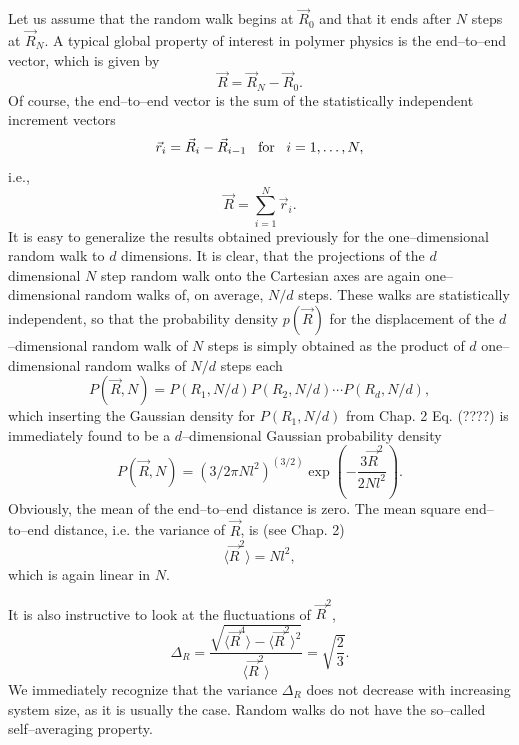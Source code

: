 Let us assume that the random walk begins at $\vec{R}_0$ and that 
it ends after $N$ steps at $\vec{R}_N$. A typical global property
of interest in polymer physics is the end--to--end vector,
which is given by
\begin{equation*}
\vec{R} = \vec{R}_N -\vec{R}_0.
\end{equation*}
Of course, the end--to--end vector is the sum of the statistically 
independent increment vectors
\begin{equation*}
\vec{r}_i = \vec{R}_i - \vec{R}_{i-1} \;\;\; {\rm for} \;\;\; 
       i=1, \ldots, N,
\end{equation*}
i.e.,
\begin{equation*}
\vec{R} = \sum_{i=1}^N \vec{r}_i.
\end{equation*}
It is easy to generalize the results obtained previously for the 
one--dimensional random walk to $d$ dimensions. It is clear, that 
the projections of the $d$ dimensional $N$ step random walk onto 
the Cartesian axes are again one--dimensional random walks of, on 
average, $N/d$ steps. These walks are statistically independent, 
so that the probability density $p(\vec{R})$ for the displacement
of the $d$--dimensional random walk of $N$ steps is simply 
obtained as the product of $d$ one--dimensional random walks of $N/d$
steps each
\begin{equation*}
P(\vec{R},N) = P(R_1,N/d) P(R_2,N/d) \cdots P(R_d,N/d),
\end{equation*}
which inserting the Gaussian density for $P(R_1,N/d)$ from Chap. 2 Eq. 
(????) is immediately found to be a $d$--dimensional Gaussian 
probability density
\begin{equation*}
P(\vec{R},N) = \left(3/2 \pi Nl^2 \right)^{(3/2)} 
              \exp\left( - \frac{3\vec{R}^2}{2Nl^2}\right).
\end{equation*}
Obviously, the mean of the end--to--end distance is zero. The mean
square end--to--end distance, i.e. the variance of $\vec{R}$, 
is (see Chap. 2) 
\begin{equation}
\label{RW_R2}
\langle \vec{R}^2 \rangle = N l^2,
\end{equation}
which is again linear in $N$.

It is also instructive to look at the fluctuations of $\vec{R}^2$,
\begin{equation*}
\Delta_R = \frac{\sqrt{\langle \vec{R}^4 \rangle - 
                   \langle \vec{R}^2\rangle^2}}
             {\langle \vec{R}^2\rangle}
             = \sqrt{\frac{2}{3}}.
\end{equation*}
We immediately recognize that the variance $\Delta_R$ does not 
decrease with increasing system size, as it is usually the case. 
Random walks do not have the so--called self--averaging property.

